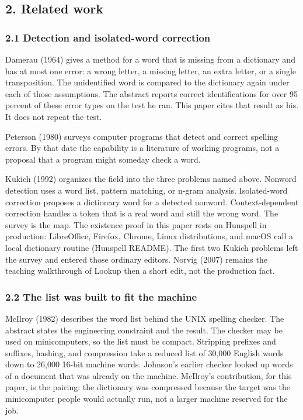 \documentclass[
  10pt,
]{article}
\begin{document}
\subsection{2. Related work}\label{related-work}

\subsubsection{2.1 Detection and isolated-word
correction}\label{detection-and-isolated-word-correction}

Damerau (1964) gives a method for a word that is missing from a
dictionary and has at most one error: a wrong letter, a missing letter,
an extra letter, or a single transposition. The unidentified word is
compared to the dictionary again under each of those assumptions. The
abstract reports correct identifications for over 95 percent of these
error types on the test he ran. This paper cites that result as his. It
does not repeat the test.

Peterson (1980) surveys computer programs that detect and correct
spelling errors. By that date the capability is a literature of working
programs, not a proposal that a program might someday check a word.

Kukich (1992) organizes the field into the three problems named above.
Nonword detection uses a word list, pattern matching, or n-gram
analysis. Isolated-word correction proposes a dictionary word for a
detected nonword. Context-dependent correction handles a token that is a
real word and still the wrong word. The survey is the map. The existence
proof in this paper rests on Hunspell in production: LibreOffice,
Firefox, Chrome, Linux distributions, and macOS call a local dictionary
routine (Hunspell README). The first two Kukich problems left the survey
and entered those ordinary editors. Norvig (2007) remains the teaching
walkthrough of Lookup then a short edit, not the production fact.

\subsubsection{2.2 The list was built to fit the
machine}\label{the-list-was-built-to-fit-the-machine}

McIlroy (1982) describes the word list behind the UNIX spelling checker.
The abstract states the engineering constraint and the result. The
checker may be used on minicomputers, so the list must be compact.
Stripping prefixes and suffixes, hashing, and compression take a reduced
list of 30,000 English words down to 26,000 16-bit machine words.
Johnson's earlier checker looked up words of a document that was already
on the machine. McIlroy's contribution, for this paper, is the pairing:
the dictionary was compressed because the target was the minicomputer
people would actually run, not a larger machine reserved for the job.
\end{document}
